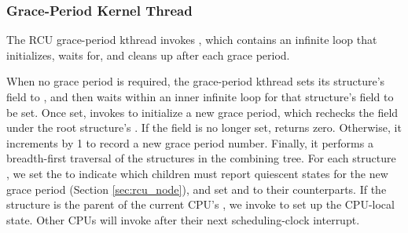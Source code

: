 \subsubsection{Grace-Period Kernel Thread} \label{sec:rcu_gp_kthread}
The RCU grace-period kthread invokes , which
contains an infinite loop that initializes, waits for, and cleans up after
each grace period. 

When no grace period is required, the grace-period kthread
sets its  structure's  field to
, and then
waits within an inner infinite loop for that structure's
 field to be set.
Once set,  invokes  to initialize
a new grace period, which
rechecks the  field under
the root  structure's .
If the field is no longer set,  returns zero.
Otherwise, it
increments  by 1 to record a new grace period number.
%
Finally, it performs a breadth-first traversal of the 
structures in the combining tree.
For each  structure ,
%
we set the  to indicate which children
must report quiescent states for the new grace period (Section 
\ref{sec:rcu_node}), and set  and 
to their  counterparts. 
%
If the  structure  is the parent of the current CPU's , 
we invoke  to set up the CPU-local  state. 
Other CPUs will invoke  after their next
scheduling-clock interrupt. %
 


